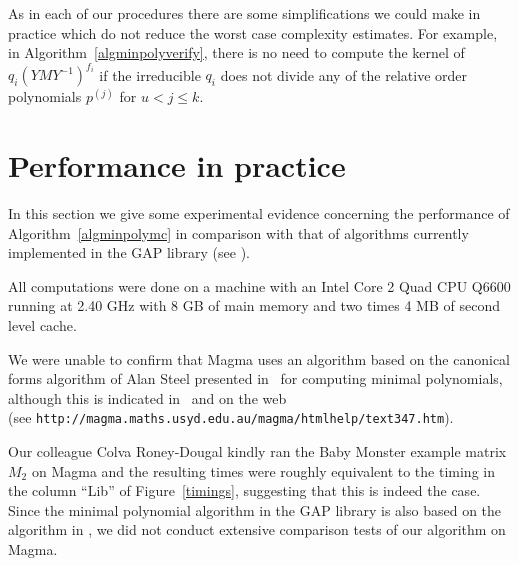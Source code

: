 \begin{Rem}
 As in each of our procedures there are some simplifications we could make in practice
which do not reduce the worst case complexity estimates. For example, in Algorithm~\ref{algminpolyverify}, there is no need to compute the kernel of $q_i(YMY^{-1})^{f_i}$ if the irreducible $q_i$ does not divide any of the relative order polynomials $p^{(j)}$ for $u<j\leq k$. 
\end{Rem}



\section{Performance in practice}
\label{performance}

In this section we give some experimental evidence concerning 
the performance of Algorithm~\ref{algminpolymc} in comparison with 
that of algorithms currently implemented in the
{\sf GAP} library (see \cite{GAP4}). 

All computations were done on a machine with an Intel Core 2 Quad CPU Q6600
running at 2.40 GHz with 8 GB of main memory and two times 4 MB of second level
cache. 

We were unable to confirm that Magma \cite{Magma} 
uses an algorithm  based on the canonical forms algorithm of Alan
Steel presented in~\cite{Steel} for computing minimal 
polynomials, although this is indicated in~\cite[Abstract]{Steel} and on the
web\\ %
(see \texttt{http://magma.maths.usyd.edu.au/magma/htmlhelp/text347.htm}).

Our colleague Colva Roney-Dougal kindly
ran the Baby Monster example matrix $M_2$ on Magma and the resulting
times were roughly equivalent to the timing in the column ``Lib'' of
Figure~\ref{timings}, suggesting that this is indeed the case. Since the
minimal polynomial algorithm in the {\sf GAP} library is also based on 
the algorithm in \cite{Steel}, we did not conduct extensive comparison tests of our
algorithm on Magma.

